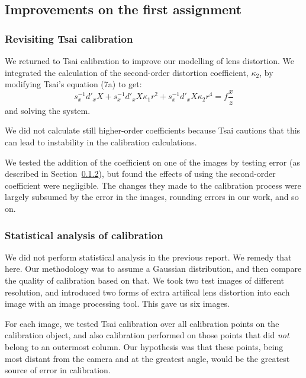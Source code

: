 
\subsection{Improvements on the first assignment}
\label{sec:improvements}

\subsubsection{Revisiting Tsai calibration}

%

We returned to Tsai calibration to improve our modelling of lens distortion. We integrated the calculation of the second-order distortion coefficient, $\kappa_{2}$, by modifying Tsai's equation (7a) to get: \cite{TSAI}
\[
	s_{x}^{-1}d'_{x}X + s_{x}^{-1}d'_{x}X\kappa_{1}r^{2} + s_{x}^{-1}d'_{x}X\kappa_{2}r^{4} = f\frac{x}{z}
\]
and solving the system.

We did not calculate still higher-order coefficients because Tsai cautions that this can lead to instability in the calibration calculations. \cite{TSAI}

We tested the addition of the coefficient on one of the images by testing error (as described in Section~\ref{sec:statcalibration}), but found the effects of using the second-order coefficient were negligible. The changes they made to the calibration process were largely subsumed by the error in the images, rounding errors in our work, and so on.

%

\subsubsection{Statistical analysis of calibration}
\label{sec:statcalibration}

We did not perform statistical analysis in the previous report. We remedy that here. Our methodology was to assume a Gaussian distribution, and then compare the quality of calibration based on that. We took two test images of different resolution, and introduced two forms of extra artifical lens distortion into each image with an image processing tool. This gave us six images.

For each image, we tested Tsai calibration over all calibration points on the calibration object, and also calibration performed on those points that did \emph{not} belong to an outermost column. Our hypothesis was that these points, being most distant from the camera and at the greatest angle, would be the greatest source of error in calibration.

